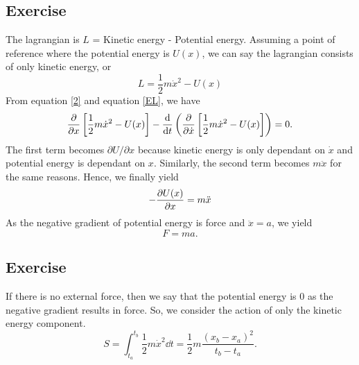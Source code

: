 \subsection{Exercise}
The lagrangian is $L$ = Kinetic energy - Potential energy. Assuming a point of reference where the potential energy is $U(x)$, we can say the lagrangian consists of only kinetic energy, or 
\begin{equation}\label{2}
    L = \frac{1}{2}m\dot x^2 - U(x)
\end{equation}
From equation \eqref{2} and equation \eqref{EL}, we have
\begin{equation}\pdv{}{x}\left[\frac{1}{2}m\dot x^2 - U(x)\right] - \dv{}{t}\left(\pdv{}{\dot x} \left[\frac{1}{2}m\dot x^2 - U(x)\right]\right) = 0.\end{equation}
The first term becomes $\partial U/\partial x$ because kinetic energy is only dependant on $\dot x$ and potential energy is dependant on $x$. Similarly, the second term becomes $m \ddot x$ for the same reasons. Hence, we finally yield
\begin{equation}
    -\pdv{U(x)}{x} = m \ddot x
\end{equation}
As the negative gradient of potential energy is force and $\ddot x = a$, we yield 
\begin{equation}
    F = ma.
\end{equation}
\subsection{Exercise}
If there is no external force, then we say that the potential energy is 0 as the negative gradient results in force. So, we consider the action of only the kinetic energy component. 
\begin{equation}
    S = \int_{t_a}^{t_b}\frac{1}{2}m\dot x^2 \dd t = \frac{1}{2}m\frac{(x_b - x_a)^2}{t_b - t_a}.
\end{equation}
